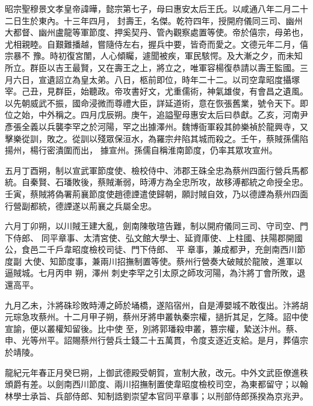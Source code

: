 
\begin{pinyinscope}

 昭宗聖穆景文孝皇帝諱曄，懿宗第七子，母曰惠安太后王氏。以咸通八年二月二十二日生於東內。十三年四月，
 封壽王，名傑。乾符四年，授開府儀同三司、幽州大都督、幽州盧龍等軍節度、押奚契丹、管內觀察處置等使。帝於僖宗，母弟也，尤相親睦。自艱難播越，嘗隨侍左右，握兵中要，皆奇而愛之。文德元年二月，僖宗暴不
 豫。時初復宮闈，人心傾矚，遽聞被疾，軍民駭愕。及大漸之夕，而未知所立。群臣以吉王最賢，又在壽王之上，將立之，唯軍容楊復恭請以壽王監國。三月六日，宣遺詔立為皇太弟。八日，柩前即位，時年二十二。以司空韋昭度攝塚宰。己丑，見群臣，始聽政。帝攻書好文，尤重儒術，神氣雄俊，有會昌之遺風。以先朝威武不振，國命浸微而尊禮大臣，詳延道術，意在恢張舊業，號令天下。即位之始，中外稱之。四月戊辰朔。庚午，追謚聖母惠安太后曰恭獻。乙亥，河南尹彥張全義以兵襲李罕之於河陽，罕之出據澤州。魏博衙軍殺其帥樂禎於龍興寺，又擊樂從訓，敗之。從訓以殘眾保洹水，為羅宗弁陷其城而殺之。壬午，蔡賊孫儒陷揚州，楊行密潰圍而出，
 據宣州。孫儒自稱淮南節度，仍率其眾攻宣州。



 五月丁酉朔，制以宣武軍節度使、檢校侍中、沛郡王硃全忠為蔡州四面行營兵馬都統。自秦賢、石璠敗後，蔡賊漸弱，時溥方為全忠所攻，故移溥都統之命授全忠。壬寅，蔡賊將偽署荊襄節度使趙德諲遣使歸朝，願討賊自效，乃以德諲為蔡州四面行營副都統，德諲遂以荊襄之兵屬全忠。



 六月丁卯朔，以川賊王建大亂，劍南陳敬瑄告難，制以開府儀同三司、守司空、門下侍郎、
 同平章事、太清宮使、弘文館大學士、延資庫使、上柱國、扶陽郡開國公，食邑二千戶韋昭度檢校司徒、門下侍郎、
 平
 章事，兼成都尹，充劍南西川節度副
 大使、知節度事，兼兩川招撫制置等使。蔡州行營奏大破賊於龍陂，進軍以逼賊城。七月丙申
 朔，澤州
 刺史李罕之引太原之師攻河陽，為汴將丁會所敗，退還高平。



 九月乙未，汴將硃珍敗時溥之師於埇橋，遂陷宿州，自是溥嬰城不敢復出。汴將胡元琮急攻蔡州。十二月甲子朔，蔡州牙將申叢執秦宗權，撾折其足，乞降。詔中使宣諭，便以叢權知留後。比中使
 至，別將郭璠殺申叢，篡宗權，縶送汴州。蔡、申、光等州平。詔賜蔡州行營兵士錢二十五萬貫，令度支逐近支給。是月，葬僖宗於靖陵。



 龍紀元年春正月癸巳朔，上御武德殿受朝賀，宣制大赦，改元。中外文武臣僚進秩頒爵有差。以劍南西川節度、兩川招撫制置使韋昭度檢校司空，為東都留守；以翰林學士承旨、兵部侍郎、知制誥劉崇望本官同平章事；以刑部侍郎孫揆為京兆尹。




\end{pinyinscope}
